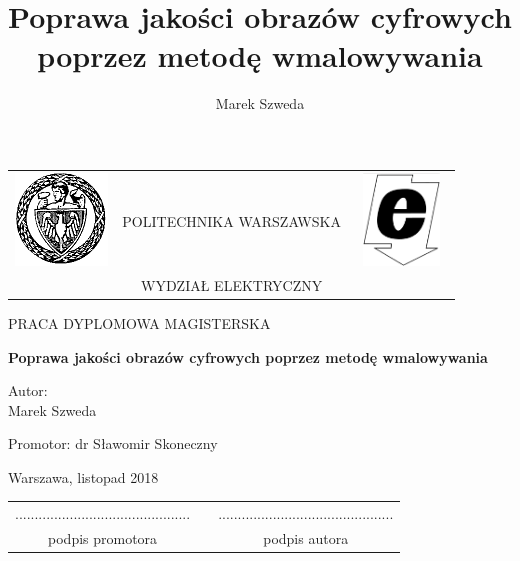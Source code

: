 \documentclass[12pt, twoside, openany]{report}
\author{Marek Szweda}
\title{Poprawa jakości obrazów cyfrowych poprzez metodę wmalowywania}
\theoremstyle{definition}
\begin{document}
\begin{titlepage}
\pagestyle{empty}

\noindent
\begin{Large}
\begin{table}[t]
\centering
\begin{tabular}[t]{lcr}
 \includegraphics[width=70pt,height=70pt]{rysunki/PW} & POLITECHNIKA WARSZAWSKA & \includegraphics[width=70pt,height=70pt]{rysunki/ele}\\
& WYDZIAŁ ELEKTRYCZNY & \\
\end{tabular}
\end{table}

\begin{center}PRACA DYPLOMOWA MAGISTERSKA\end{center}
\end{Large}
\begin{center}
\Huge
\textbf{Poprawa jakości obrazów cyfrowych poprzez metodę wmalowywania}
\end{center}
\vfill
\begin{center}
\Large
Autor:\\
\LARGE
Marek Szweda
\end{center}
\vfill
\begin{center}
\Large
Promotor: dr Sławomir Skoneczny
\end{center}
\vfill
\begin{center}
\large
Warszawa, listopad 2018
\end{center}
\newpage
\hfill
\begin{table}[b]
\centering
\begin{tabular}[t]{ccc}
............................................. & \hspace*{100pt} & .............................................\\
podpis promotora & \hspace*{100pt} & podpis autora
\end{tabular}
\end{table}


\end{titlepage}
\thispagestyle{empty}
\newpage
\pagestyle{headings}
\setcounter{page}{1}
\end{document}
